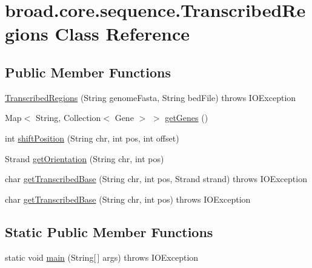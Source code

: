 \hypertarget{classbroad_1_1core_1_1sequence_1_1_transcribed_regions}{\section{broad.\+core.\+sequence.\+Transcribed\+Regions Class Reference}
\label{classbroad_1_1core_1_1sequence_1_1_transcribed_regions}
}
\subsection*{Public Member Functions}
\begin{DoxyCompactItemize}
\item 
\hyperlink{classbroad_1_1core_1_1sequence_1_1_transcribed_regions_a1543ff9c85d58d2a8157e63b01edcede}{Transcribed\+Regions} (String genome\+Fasta, String bed\+File)  throws I\+O\+Exception 
\item 
Map$<$ String, Collection$<$ Gene $>$ $>$ \hyperlink{classbroad_1_1core_1_1sequence_1_1_transcribed_regions_a90654b16eed66a82727aae8abe59587c}{get\+Genes} ()
\item 
int \hyperlink{classbroad_1_1core_1_1sequence_1_1_transcribed_regions_aeec2d82099da998442a46c749447fdad}{shift\+Position} (String chr, int pos, int offset)
\item 
Strand \hyperlink{classbroad_1_1core_1_1sequence_1_1_transcribed_regions_a065fbc2f6f4b0de5564df618b9ca8376}{get\+Orientation} (String chr, int pos)
\item 
char \hyperlink{classbroad_1_1core_1_1sequence_1_1_transcribed_regions_ad930ec63439d92b88207511295100f82}{get\+Transcribed\+Base} (String chr, int pos, Strand strand)  throws I\+O\+Exception 
\item 
char \hyperlink{classbroad_1_1core_1_1sequence_1_1_transcribed_regions_a14f86661f3200488c758ba74caa9e0d3}{get\+Transcribed\+Base} (String chr, int pos)  throws I\+O\+Exception 
\end{DoxyCompactItemize}
\subsection*{Static Public Member Functions}
\begin{DoxyCompactItemize}
\item 
static void \hyperlink{classbroad_1_1core_1_1sequence_1_1_transcribed_regions_a4792cac14f26c00b690a0a93a197f3c4}{main} (String\mbox{[}$\,$\mbox{]} args)  throws I\+O\+Exception 
\end{DoxyCompactItemize}


